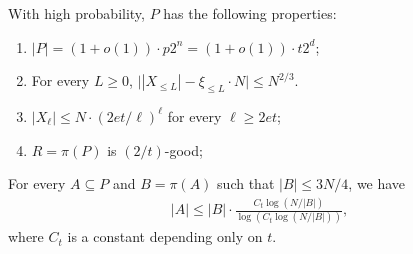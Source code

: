 \documentclass[10pt,a4paper]{amsart}
\begin{document}
\begin{proposition}\label{prop:Pprop}
  With high probability, $P$ has the following properties:
  \begin{enumerate}[label=(P\arabic*)]
  \item
    \label{item:P-size}
    $|P| = (1 + o(1)) \cdot p2^n = (1+o(1)) \cdot t 2^d$;
  \item
    \label{item:P-fibers-empirical-dist}
    For every $L \ge 0$, $\bigl||X_{\le L}| - \xi_{\le L} \cdot N\bigr| \le N^{2/3}$.
  \item
    \label{item:P-fibers-tail}
    $|X_\ell| \le N\cdot(2et/\ell)^\ell$ for every $\ell \ge 2et$;
  \item
    \label{item:P-pi-good}
    $R = \pi(P)$ is $(2/t)$-good;
  \end{enumerate}
\end{proposition}

\begin{claim}\label{clm:B}
  For every $A \subseteq P$ and $B = \pi(A)$ such that $|B| \leq 3N / 4$, we have
  \begin{align*}
    |A| \leq |B| \cdot \frac{C_t \log ( N/|B|)}{\log \left(C_t\log\left(N/|B|\right)\right)},
  \end{align*}
  where $C_t$ is a constant depending only on $t$.
\end{claim}
\end{document}
